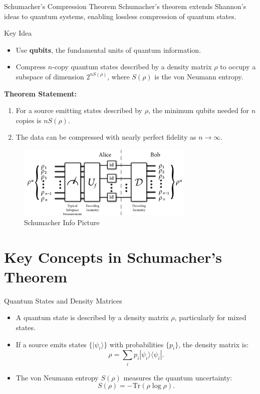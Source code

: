 \begin{frame}{Schumacher's Compression Theorem}
    Schumacher's theorem extends Shannon's ideas to quantum systems, enabling lossless compression of quantum states.
    \begin{block}{Key Idea}
        \begin{itemize}
            \item Use \textbf{qubits}, the fundamental units of quantum information.
            \item Compress \( n \)-copy quantum states described by a density matrix \( \rho \) to occupy a subspace of dimension \( 2^{n S(\rho)} \), where \( S(\rho) \) is the von Neumann entropy.
        \end{itemize}
    \end{block}
    \textbf{Theorem Statement:}
    \begin{enumerate}
        \item For a source emitting states described by \( \rho \), the minimum qubits needed for \( n \) copies is \( n S(\rho) \).
        \item The data can be compressed with nearly perfect fidelity as \( n \to \infty \).
    \end{enumerate}
    \begin{figure}[h]
        \centering
        \includegraphics[width=0.75\textwidth]{figures/schumacher.png}
        \caption{Schumacher Info Picture \cite{PhysRevA.51.2738}}
    \end{figure}
\end{frame}

\section{Key Concepts in Schumacher's Theorem}

\begin{frame}{Quantum States and Density Matrices}
    \begin{itemize}
        \item A quantum state is described by a density matrix \( \rho \), particularly for mixed states.
        \item If a source emits states \( \{ |\psi_i\rangle \} \) with probabilities \( \{ p_i \} \), the density matrix is:
        \[
        \rho = \sum_i p_i |\psi_i\rangle \langle \psi_i|.
        \]
        \item The von Neumann entropy \( S(\rho) \) measures the quantum uncertainty:
        \[
        S(\rho) = -\text{Tr}(\rho \log \rho).
        \]
    \end{itemize}
\end{frame}

